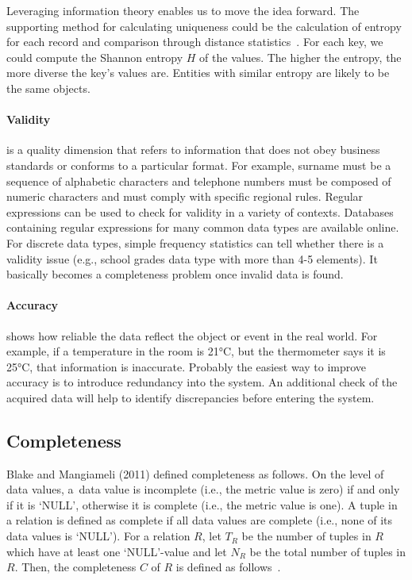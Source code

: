 Leveraging information theory enables us to move the idea forward.
The supporting method for calculating uniqueness could be the calculation of entropy for each record and comparison through distance statistics~\cite{venkatesh2010}.
For each key, we could compute the Shannon entropy \( H \) of the values.
The higher the entropy, the more diverse the key's values are.
Entities with similar entropy are likely to be the same objects.

\paragraph*{Validity} is a quality dimension that refers to information that does not obey business standards or conforms to a particular format.
For example, surname must be a sequence of alphabetic characters and telephone numbers must be composed of numeric characters and must comply with specific regional rules.
Regular expressions can be used to check for validity in a variety of contexts.
Databases containing regular expressions for many common data types are available online.
For discrete data types, simple frequency statistics can tell whether there is a validity issue (e.g., school grades data type with more than 4-5 elements).
It basically becomes a completeness problem once invalid data is found.

\paragraph*{Accuracy} shows how reliable the data reflect the object or event in the real world.
For example, if a temperature in the room is 21°C, but the thermometer says it is 25°C, that information is inaccurate.
Probably the easiest way to improve accuracy is to introduce redundancy into the system.
An additional check of the acquired data will help to identify discrepancies before entering the system.

\subsection{Completeness}

Blake and Mangiameli (2011) defined completeness as follows.
On the level of data values, a~data value is incomplete (i.e., the metric value is zero) if and only if it is \enquote*{NULL}, otherwise it is complete (i.e., the metric value is one).
A tuple in a relation is defined as complete if all data values are complete (i.e., none of its data values is \enquote*{NULL}).
For a relation \( R \), let \( T_R \) be the number of tuples in \( R \) which have at least one \enquote*{NULL}-value and let \( N_R \) be the total number of tuples in \( R \). Then, the completeness \( C \) of \( R \) is defined as follows~\cite{blake2011}.

